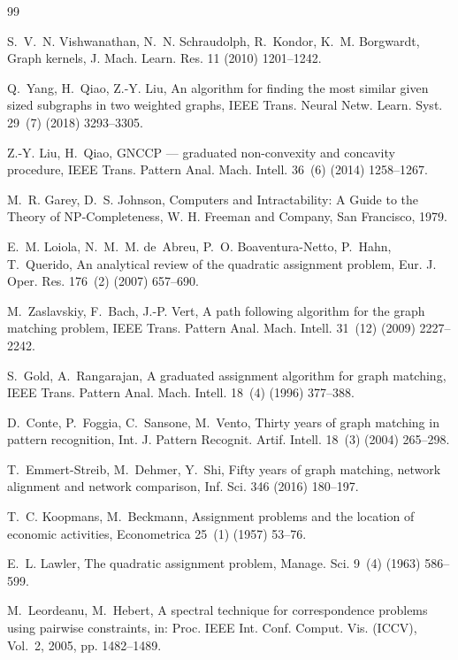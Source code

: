 \documentclass[a4paper,fleqn]{cas-dc}
\theoremstyle{thmstyleone}
\theoremstyle{thmstyletwo}
\theoremstyle{thmstylethree}
\begin{document}
\begin{thebibliography}{99}

S.~V.~N. Vishwanathan, N.~N. Schraudolph, R.~Kondor, K.~M. Borgwardt, Graph kernels, J. Mach. Learn. Res. 11 (2010) 1201--1242.

Q.~Yang, H.~Qiao, Z.-Y. Liu, An algorithm for finding the most similar given sized subgraphs in two weighted graphs, IEEE Trans. Neural Netw. Learn. Syst. 29~(7) (2018) 3293--3305.

Z.-Y. Liu, H.~Qiao, {GNCCP} --- graduated non-convexity and concavity procedure, IEEE Trans. Pattern Anal. Mach. Intell. 36~(6) (2014) 1258--1267.

M.~R. Garey, D.~S. Johnson, Computers and Intractability: A Guide to the Theory of NP-Completeness, W. H. Freeman and Company, San Francisco, 1979.

E.~M. Loiola, N.~M.~M. de~Abreu, P.~O. Boaventura-Netto, P.~Hahn, T.~Querido, An analytical review of the quadratic assignment problem, Eur. J. Oper. Res. 176~(2) (2007) 657--690.

M.~Zaslavskiy, F.~Bach, J.-P. Vert, A path following algorithm for the graph matching problem, IEEE Trans. Pattern Anal. Mach. Intell. 31~(12) (2009) 2227--2242.

S.~Gold, A.~Rangarajan, A graduated assignment algorithm for graph matching, IEEE Trans. Pattern Anal. Mach. Intell. 18~(4) (1996) 377--388.

D.~Conte, P.~Foggia, C.~Sansone, M.~Vento, Thirty years of graph matching in pattern recognition, Int. J. Pattern Recognit. Artif. Intell. 18~(3) (2004) 265--298.

T.~Emmert-Streib, M.~Dehmer, Y.~Shi, Fifty years of graph matching, network alignment and network comparison, Inf. Sci. 346 (2016) 180--197.

T.~C. Koopmans, M.~Beckmann, Assignment problems and the location of economic activities, Econometrica 25~(1) (1957) 53--76.

E.~L. Lawler, The quadratic assignment problem, Manage. Sci. 9~(4) (1963) 586--599.

M.~Leordeanu, M.~Hebert, A spectral technique for correspondence problems using pairwise constraints, in: Proc. IEEE Int. Conf. Comput. Vis. (ICCV), Vol.~2, 2005, pp. 1482--1489.


\end{thebibliography}
\end{document}

